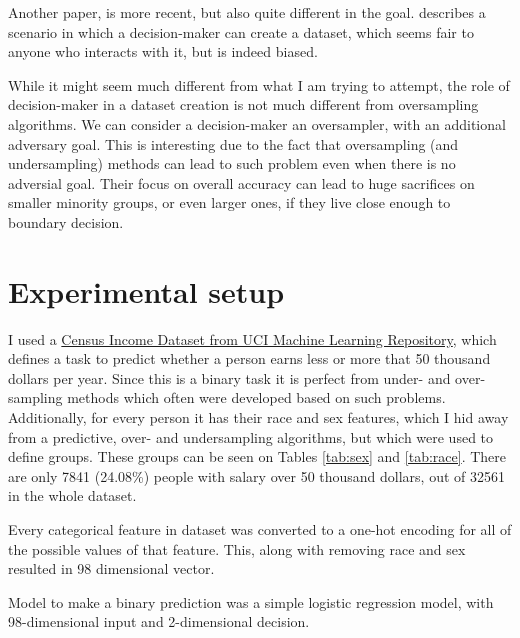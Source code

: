 \documentclass{article}
\begin{document}
Another paper, is more recent, but also quite different in the goal. \cite{fukuchi2019faking} describes a scenario in which a decision-maker can create a dataset, which seems fair to anyone who interacts with it, but is indeed biased.

While it might seem much different from what I am trying to attempt, the role of decision-maker in a dataset creation is not much different from oversampling algorithms. We can consider a decision-maker an oversampler, with an additional adversary goal. This is interesting due to the fact that oversampling (and undersampling) methods can lead to such problem even when there is no adversial goal. Their focus on overall accuracy can lead to huge sacrifices on smaller minority groups, or even larger ones, if they live close enough to boundary decision.

\section{Experimental setup}

I used a \href{https://archive.ics.uci.edu/ml/datasets/Census+Income}{Census Income Dataset from UCI Machine Learning Repository}, which defines a task to predict whether a person earns less or more that 50 thousand dollars per year. Since this is a binary task it is perfect from under- and over-sampling methods which often were developed based on such problems. Additionally, for every person it has their race and sex features, which I hid away from a predictive, over- and undersampling algorithms, but which were used to define groups. These groups can be seen on Tables \ref{tab:sex} and \ref{tab:race}. There are only 7841 (24.08\%) people with salary over 50 thousand dollars, out of 32561 in the whole dataset.

Every categorical feature in dataset was converted to a one-hot encoding for all of the possible values of that feature. This, along with removing race and sex resulted in 98 dimensional vector.

Model to make a binary prediction was a simple logistic regression model, with 98-dimensional input and 2-dimensional decision.
\end{document}
